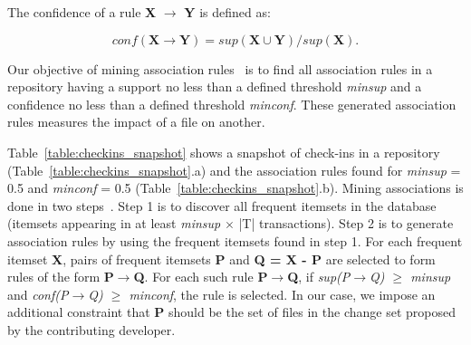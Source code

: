The confidence of a rule \textbf{X} $\rightarrow$ \textbf{Y} is defined as:

\begin{equation}
conf(\textbf{X} \rightarrow \textbf{Y}) = \textit{sup}(\textbf{X}\cup\textbf{Y}) / \textit{sup}(\textbf{X}). 
\end{equation}

Our objective of mining association rules~\cite{Agrawal} is to find all association rules in a repository having a support no less than a defined threshold \textit{minsup} and a confidence no less
than a defined threshold \textit{minconf}. These generated association rules measures the impact of a file on another.

Table~\ref{table:checkins_snapshot} shows a snapshot of check-ins in a repository (Table~\ref{table:checkins_snapshot}.a) and the association rules found for \textit{minsup} = 0.5 and \textit{minconf} = 0.5 (Table~\ref{table:checkins_snapshot}.b). Mining associations is done in two steps~\cite{Agrawal}. Step 1 is to discover all frequent itemsets in the database (itemsets appearing in at least \textit{minsup} $\times$ |T| transactions). Step 2 is to generate association rules by using the frequent itemsets found in step 1. For each frequent itemset \textbf{X}, pairs of frequent itemsets \textbf{P} and \textbf{Q = X - P} are selected to form rules of the form \textbf{P$\rightarrow$Q}. For each such rule \textbf{P$\rightarrow$Q}, if \textit{sup(P$\rightarrow$Q) $\ge$ minsup} and \textit{conf(P$\rightarrow$Q) $\ge$ minconf}, the rule is selected. In our case, we impose an additional constraint that \textbf{P} should be the set of files in the change set proposed by the contributing developer.

